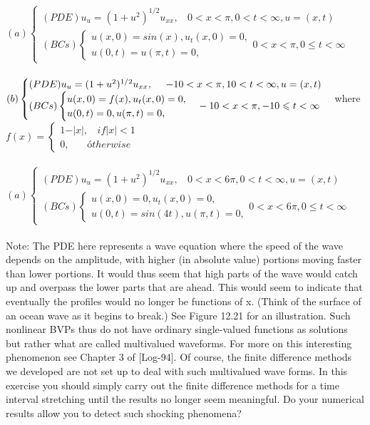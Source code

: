 \documentclass[../main.tex]{subfiles}
\begin{document}
{{\begin{enumerate}
\\
\\
$	(a)\begin{cases} 
	(PDE) u_u=(1+u^2)^{1/2}u_{xx},
	~~~~0<x<\pi, 0<t<\infty,u=(x,t)\\
(BCs)
		\begin{cases}
		u(x,0)=sin(x), u_t(x,0)=0,\\
		u(0,t)=u(\pi,t)=0,
		\end{cases}
		0<x<\pi, 0\leqslant t< \infty 
	\end{cases}$
\\
\\
$	(b)\begin{cases} 
	(PDE) u_u=(1+u^2)^{1/2}u_{xx},
	~~~~-10<x<\pi, 10<t<\infty,u=(x,t)\\
(BCs)
		\begin{cases}
		u(x,0)=f(x), u_t(x,0)=0,\\
		u(0,t)=0,u(\pi,t)=0,
		\end{cases}
		-10<x<\pi, -10\leqslant t< \infty 
	\end{cases}\\
	$where$ f(x)= \begin{cases}
	1-\vert x \vert, ~~~~if\vert x\vert<1\\
	0,~~~~~~~~ótherwise
	\end{cases}$
\\
\\
$	(a)\begin{cases} 
	(PDE) u_u=(1+u^2)^{1/2}u_{xx},
	~~~~0<x<6\pi, 0<t<\infty,u=(x,t)\\
(BCs)
		\begin{cases}
		u(x,0)=0, u_t(x,0)=0,\\
		u(0,t)=sin(4t),u(\pi, t)=0,
		\end{cases}
		0<x<6\pi, 0\leqslant t< \infty 
	\end{cases}$
\\
\\Note: The PDE here represents a wave equation where the speed of the wave depends on the amplitude, with higher (in absolute value) portions moving faster than lower portions. It would thus seem that high parts of the wave would catch up and overpass the lower parts that are ahead. This would seem to indicate that eventually the profiles would no longer be functions of x. (Think of the surface of an ocean wave as it begins to break.) See Figure 12.21 for an illustration. Such nonlinear BVPs thus do not have ordinary single-valued functions as solutions but rather what are called multivalued waveforms. For more on this interesting phenomenon see Chapter 3 of [Log-94]. Of course, the finite difference methods we developed are not set up to deal with such multivalued wave forms. In this exercise you should simply carry out the finite difference methods for a time interval stretching until the results no longer seem meaningful. Do your numerical results allow you to detect such shocking phenomena? 

\end{enumerate}}}
\end{document}
